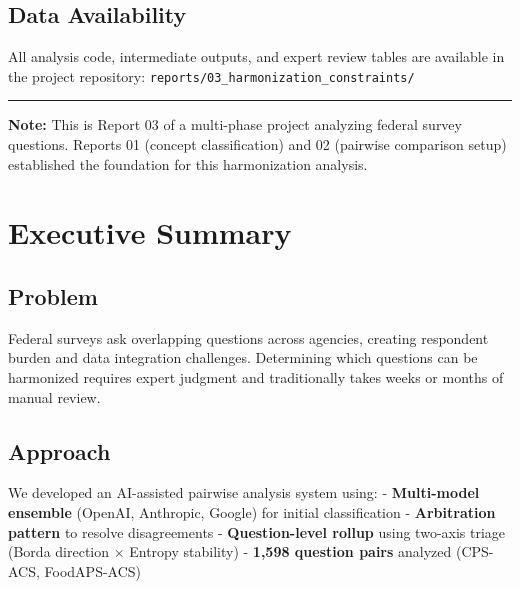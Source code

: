\documentclass[
  letterpaper,
]{report}
\begin{document}
\section{Data Availability}\label{data-availability}

All analysis code, intermediate outputs, and expert review tables are
available in the project repository:
\texttt{reports/03\_harmonization\_constraints/}

\begin{center}\rule{0.5\linewidth}{0.5pt}\end{center}

\textbf{Note:} This is Report 03 of a multi-phase project analyzing
federal survey questions. Reports 01 (concept classification) and 02
(pairwise comparison setup) established the foundation for this
harmonization analysis.


\chapter*{Executive Summary}\label{executive-summary}


\section*{Problem}\label{problem}


Federal surveys ask overlapping questions across agencies, creating
respondent burden and data integration challenges. Determining which
questions can be harmonized requires expert judgment and traditionally
takes weeks or months of manual review.

\section*{Approach}\label{approach}


We developed an AI-assisted pairwise analysis system using: -
\textbf{Multi-model ensemble} (OpenAI, Anthropic, Google) for initial
classification - \textbf{Arbitration pattern} to resolve disagreements -
\textbf{Question-level rollup} using two-axis triage (Borda direction ×
Entropy stability) - \textbf{1,598 question pairs} analyzed (CPS-ACS,
FoodAPS-ACS)
\end{document}
